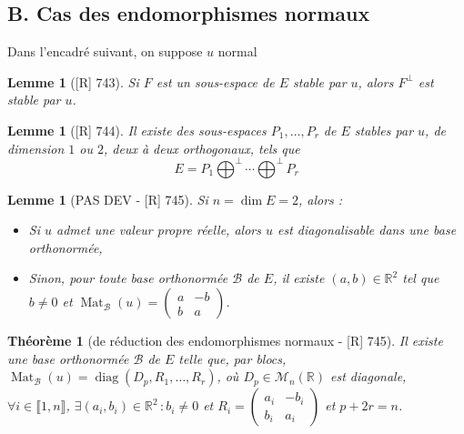 \documentclass[10pt, a4paper, parskip=full, twoside, twocolumn]{report}
\newtheorem{theorem}[definition]{Théorème}
\newtheorem{lemma}[definition]{Lemme}
\newcommand{\IR}{\mathbb{R}}
\DeclareMathOperator{\Mat}{Mat}
\DeclareMathOperator{\diag}{diag}
\begin{document}
\subsection*{B. Cas des endomorphismes normaux}
\textcolor{paragraphtext}{Dans l'encadré suivant, on suppose $u$ normal}


\begin{tcolorbox}[
    breakable, %
    colback=developpement, %
    colframe=gray!0!black, %
    boxrule=0pt, %
    arc=1mm, %
	boxsep=0pt,
	left=0pt, right=0pt, top=0pt, bottom=0pt
]
\begin{lemma}[\textnormal{[R] 743}]
	\label{151dev12}
	Si $F$ est un sous-espace de $E$ stable par $u$, alors $F^{\perp}$ est stable par $u$.
\end{lemma}
\begin{lemma}[\textnormal{[R] 744}]
	\label{151dev13}
	Il existe des sous-espaces $P_1,\dots, P_r$ de $E$ stables par $u$, de dimension $1$ ou $2$, deux à deux orthogonaux, tels que 
	$$E = P_1\bigoplus^{\perp}\cdots\bigoplus^{\perp} P_r$$
\end{lemma}
\end{tcolorbox}

\begin{lemma}[PAS DEV - \textnormal{[R] 745}]
	Si $n = \dim E = 2$, alors :
	\begin{itemize}
		\item Si $u$ admet une valeur propre réelle, alors $u$ est diagonalisable dans une base orthonormée,
		\item Sinon, pour toute base orthonormée $\mathcal{B}$ de $E$, il existe $(a,b)\in\IR^2$ tel que $b\neq 0$ et $\Mat_{\mathcal{B}}(u)=\begin{pmatrix}
			a & -b \\ b & a
		\end{pmatrix}$.
	\end{itemize}
\end{lemma}

\begin{tcolorbox}[
    breakable, %
    colback=developpement, %
    colframe=gray!0!black, %
    boxrule=0pt, %
    arc=1mm, %
	boxsep=0pt,
	left=0pt, right=0pt, top=0pt, bottom=0pt
]
\begin{theorem}[de réduction des endomorphismes normaux - \textnormal{[R] 745}]
	Il existe une base orthonormée $\mathcal{B}$ de $E$ telle que, par blocs, $\Mat_{\mathcal{B}}(u) = \diag(D_p, R_1,\dots, R_r)$, où 
	$D_p\in\mathcal{M}_n(\IR)$ est diagonale, $\forall i\in \llbracket 1,n\rrbracket$, $\exists (a_i, b_i)\in\IR^2\,\colon b_i \neq 0$ et $R_i = \begin{pmatrix}
		a_i & -b_i \\ b_i & a_i
	\end{pmatrix}$ et $p+2r = n$.
\end{theorem}
\end{tcolorbox}
\end{document}
